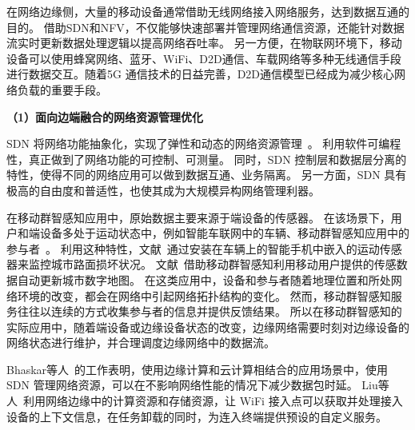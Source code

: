 在网络边缘侧，大量的移动设备通常借助无线网络接入网络服务，达到数据互通的目的。
借助SDN和NFV，不仅能够快速部署并管理网络通信资源，还能针对数据流实时更新数据处理逻辑以提高网络吞吐率。
另一方便，在物联网环境下，移动设备可以使用蜂窝网络、蓝牙、WiFi、D2D通信、车载网络等多种无线通信手段进行数据交互。随着5G 通信技术的日益完善，D2D通信模型已经成为减少核心网络负载的重要手段。

\textbf{（1）面向边端融合的网络资源管理优化}

SDN 将网络功能抽象化，实现了弹性和动态的网络资源管理~\cite{DBLP:journals/jzusc/WangWYG18}。
利用软件可编程性，真正做到了网络功能的可控制、可测量。
同时，SDN 控制层和数据层分离的特性，使得不同的网络应用可以做到数据互通、业务隔离。
另一方面，SDN 具有极高的自由度和普适性，也使其成为大规模异构网络管理利器。



在移动群智感知应用中，原始数据主要来源于端设备的传感器。
在该场景下，用户和端设备多处于运动状态中，例如智能车联网中的车辆、移动群智感知应用中的参与者~\cite{DBLP:journals/jsac/LyuNTLWGP17}。
利用这种特性，文献~通过安装在车辆上的智能手机中嵌入的运动传感器来监控城市路面损坏状况。
文献~借助移动群智感知利用移动用户提供的传感数据自动更新城市数字地图。
在这类应用中，设备和参与者随着地理位置和所处网络环境的改变，都会在网络中引起网络拓扑结构的变化。
然而，移动群智感知服务往往以连续的方式收集参与者的信息并提供反馈结果。
所以在移动群智感知的实际应用中，随着端设备或边缘设备状态的改变，边缘网络需要时刻对边缘设备的网络状态进行维护，并合理调度边缘网络中的数据流。

Bhaskar等人~\cite{DBLP:conf/infocom/RimalVM16}的工作表明，使用边缘计算和云计算相结合的应用场景中，使用 SDN 管理网络资源，可以在不影响网络性能的情况下减少数据包时延。
Liu等人~\cite{DBLP:conf/edge/LiuWB16}利用网络边缘中的计算资源和存储资源，让 WiFi 接入点可以获取并处理接入设备的上下文信息，在任务卸载的同时，为连入终端提供预设的自定义服务。



